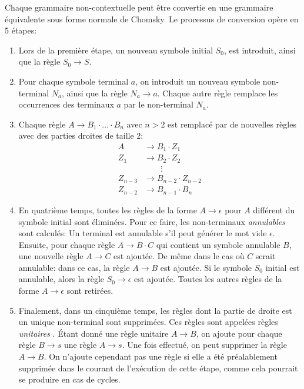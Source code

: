 Chaque grammaire non-contextuelle peut être convertie en une grammaire équivalente sous forme normale de Chomsky.
Le processus de conversion opère en 5 étapes:
\begin{enumerate}
\item Lors de la première étape, un nouveau symbole initial $S_0$, est introduit, ainsi que la règle $S_0 \to S$.
\item Pour chaque symbole terminal $a$, on introduit un nouveau symbole non-terminal $N_a$, ainsi que la règle $N_a \to a$.
Chaque autre règle remplace les occurrences des terminaux $a$ par le non-terminal $N_a$.
\item Chaque règle $A \to B_1 \cdot \ldots \cdot B_n$ avec $n > 2$ est remplacé par de nouvelles règles avec des parties droites de taille $2$:
\begin{align*}
A &\to B_1 \cdot Z_1\\
Z_1 &\to B_2 \cdot Z_2\\
&\hspace{2em} \vdots\\
Z_{n - 3} &\to B_{n - 2} \cdot Z_{n - 2}\\
Z_{n - 2} &\to B_{n - 1} \cdot B_n
\end{align*}
\item En quatrième temps, toutes les règles de la forme $A \to \epsilon$ pour $A$ différent du symbole initial sont éliminées.
Pour ce faire, les non-terminaux \og \textit{annulables} \fg{} sont calculés: Un terminal est annulable s'il peut générer le mot vide $\epsilon$.
Ensuite, pour chaque règle $A \to B \cdot C$ qui contient un symbole annulable $B$, une nouvelle règle $A \to C$ est ajoutée.
De même dans le cas où $C$ serait annulable: dans ce cas, la règle $A \to B$ est ajoutée.
Si le symbole $S_0$ initial est annulable, alors la règle $S_0 \to \epsilon$ est ajoutée.
Toutes les autres règles de la forme $A \to \epsilon$ sont retirées.
\item
Finalement, dans un cinquième temps, les règles dont la partie de droite est un unique non-terminal sont supprimées.
Ces règles sont appelées règles \og \textit{unitaires} \fg{}.
Étant donné une règle unitaire $A \to B$, on ajoute pour chaque règle $B \to s$ une règle $A \to s$. Une fois effectué, on peut supprimer la règle $A \to B$. On n'ajoute cependant pas une règle si elle a été préalablement supprimée dans le courant de l'exécution de cette étape, comme cela pourrait se produire en cas de cycles. 	 
\end{enumerate}

